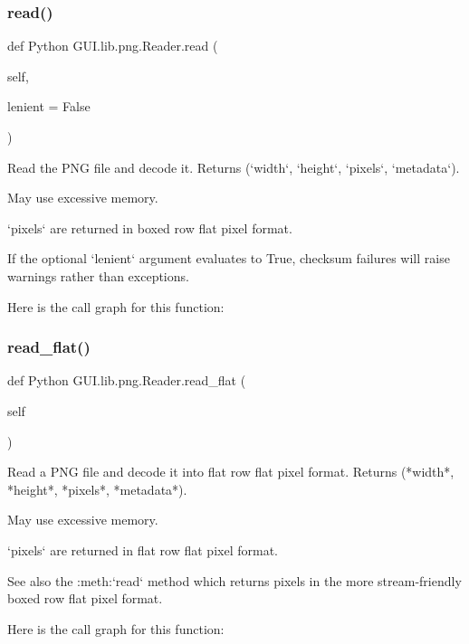 \subsubsection{\texorpdfstring{read()}{read()}}
{\footnotesize\ttfamily def Python G\+U\+I.\+lib.\+png.\+Reader.\+read (\begin{DoxyParamCaption}\item[{}]{self,  }\item[{}]{lenient = {\ttfamily False} }\end{DoxyParamCaption})}

\begin{DoxyVerb}Read the PNG file and decode it.  Returns (`width`, `height`,
`pixels`, `metadata`).

May use excessive memory.

`pixels` are returned in boxed row flat pixel format.

If the optional `lenient` argument evaluates to True,
checksum failures will raise warnings rather than exceptions.
\end{DoxyVerb}
 Here is the call graph for this function\+:
\mbox{\label{class_python_01_g_u_i_1_1lib_1_1png_1_1_reader_a6fc020ac3f8fda8df4d3bd6d9eb829f2}} 
\subsubsection{\texorpdfstring{read\+\_\+flat()}{read\_flat()}}
{\footnotesize\ttfamily def Python G\+U\+I.\+lib.\+png.\+Reader.\+read\+\_\+flat (\begin{DoxyParamCaption}\item[{}]{self }\end{DoxyParamCaption})}

\begin{DoxyVerb}Read a PNG file and decode it into flat row flat pixel format.
Returns (*width*, *height*, *pixels*, *metadata*).

May use excessive memory.

`pixels` are returned in flat row flat pixel format.

See also the :meth:`read` method which returns pixels in the
more stream-friendly boxed row flat pixel format.
\end{DoxyVerb}
 Here is the call graph for this function\+:
\mbox{\label{class_python_01_g_u_i_1_1lib_1_1png_1_1_reader_ac0c234ad7bec1ecc87733167e8aa4fbc}} 
